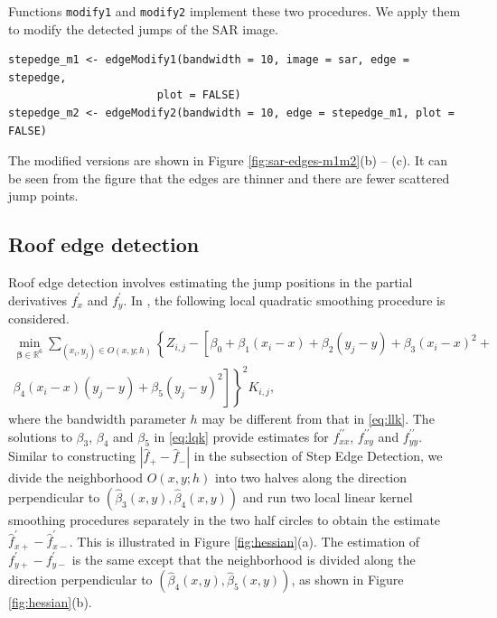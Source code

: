 Functions \texttt{modify1} and \texttt{modify2} implement these two procedures. We apply them to modify the detected jumps of the SAR image.

\begin{verbatim}
stepedge_m1 <- edgeModify1(bandwidth = 10, image = sar, edge = stepedge, 
                       plot = FALSE)
stepedge_m2 <- edgeModify2(bandwidth = 10, edge = stepedge_m1, plot = FALSE)
\end{verbatim}

The modified versions are shown in Figure \ref{fig:sar-edges-m1m2}(b) -- (c). It can be seen from the figure that the edges are thinner and there are fewer scattered jump points.

\subsection{Roof edge detection}\label{sec:JLC.roof}

Roof edge detection involves estimating the jump positions in the partial derivatives \(f^\prime_x\) and \(f^\prime_y\). In \citet{qiu2015blind}, the following local quadratic smoothing procedure is considered.
\begin{equation}
  \label{eq:lqk}
  \begin{aligned}
    \min_{\boldsymbol{\beta} \in \mathbb{R}^6} \sum_{(x_i, y_j) \in O(x, y; h)} \left\{ Z_{i, j} - \left[\beta_0 + \beta_1(x_i - x) + \beta_2(y_j - y) + \beta_3 (x_i - x)^2 + \right. \right. \\
    \left. \left. \beta_4 (x_i - x) (y_j - y) + \beta_5 (y_j - y)^2 \right]  \right\}^2 K_{i, j},
\end{aligned}
\end{equation}
where the bandwidth parameter \(h\) may be different from that in \eqref{eq:llk}. The solutions to \(\beta_3\), \(\beta_4\) and \(\beta_5\) in \eqref{eq:lqk} provide estimates for \(f^{\prime\prime}_{xx}\), \(f^{\prime\prime}_{xy}\) and \(f^{\prime\prime}_{yy}\). Similar to constructing \(|\widehat{f}_{+} - \widehat{f}_{-}|\) in the subsection of Step Edge Detection, we divide the neighborhood \(O(x, y; h)\) into two halves along the direction perpendicular to \((\widehat{\beta}_3(x, y), \widehat{\beta}_4(x, y))\) and run two local linear kernel smoothing procedures separately in the two half circles to obtain the estimate \(\widehat{f}^\prime_{x+} - \widehat{f}^\prime_{x-}\). This is illustrated in Figure \ref{fig:hessian}(a). The estimation of \(f^\prime_{y+} - f^\prime_{y-}\) is the same except that the neighborhood is divided along the direction perpendicular to \((\widehat{\beta}_4(x, y), \widehat{\beta}_5(x, y))\), as shown in Figure \ref{fig:hessian}(b).

